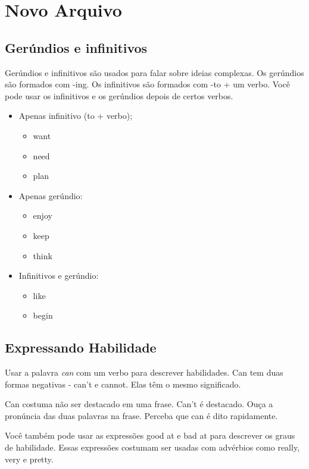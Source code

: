 \section{Novo Arquivo}
\subsection{Gerúndios e infinitivos}

Gerúndios e infinitivos são usados para falar sobre ideias complexas. Os gerúndios são formados com -ing. Os infinitivos são formados com -to + um verbo. Você pode usar os infinitivos e os gerúndios depois de certos verbos.

\begin{itemize}
\item Apenas infinitivo (to + verbo);
\begin{itemize}
\item want
\item need
\item plan
\end{itemize}

\item Apenas gerúndio:
\begin{itemize}
	\item enjoy
	\item keep
	\item think
\end{itemize}

\item Infinitivos e gerúndio:
\begin{itemize}
	\item like
	\item begin
\end{itemize}
\end{itemize}


\subsection{Expressando Habilidade}

Usar a palavra \emph{can} com um verbo para descrever habilidades.
Can tem duas formas negativas - can't e cannot. Elas têm o mesmo significado. 

Can costuma não ser destacado em uma frase. Can't é destacado. Ouça a pronúncia das duas palavras na frase. Perceba que can é dito rapidamente.

Você também pode usar as expressões good at e bad at para descrever os graus de habilidade. Essas expressões costumam ser usadas com advérbios como really, very e pretty. 

